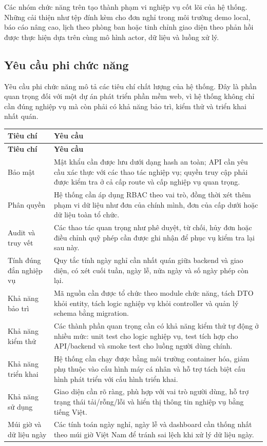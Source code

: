 Các nhóm chức năng trên tạo thành phạm vi nghiệp vụ cốt lõi của hệ thống. Những cải thiện như tệp đính kèm cho đơn nghỉ trong môi trường demo local, báo cáo nâng cao, lịch theo phòng ban hoặc tinh chỉnh giao diện theo phản hồi được thực hiện dựa trên cùng mô hình actor, dữ liệu và luồng xử lý.

\subsection{Yêu cầu phi chức năng}
Yêu cầu phi chức năng mô tả các tiêu chí chất lượng của hệ thống. Đây là phần quan trọng đối với một dự án phát triển phần mềm web, vì hệ thống không chỉ cần đúng nghiệp vụ mà còn phải có khả năng bảo trì, kiểm thử và triển khai nhất quán.

\begin{longtable}{p{}p{}}
\toprule
\textbf{Tiêu chí} & \textbf{Yêu cầu} \\
\midrule
\endfirsthead
\toprule
\textbf{Tiêu chí} & \textbf{Yêu cầu} \\
\midrule
\endhead
Bảo mật & Mật khẩu cần được lưu dưới dạng hash an toàn; API cần yêu cầu xác thực với các thao tác nghiệp vụ; quyền truy cập phải được kiểm tra ở cả cấp route và cấp nghiệp vụ quan trọng. \\
Phân quyền & Hệ thống cần áp dụng RBAC theo vai trò, đồng thời xét thêm phạm vi dữ liệu như đơn của chính mình, đơn của cấp dưới hoặc dữ liệu toàn tổ chức. \\
Audit và truy vết & Các thao tác quan trọng như phê duyệt, từ chối, hủy đơn hoặc điều chỉnh quỹ phép cần được ghi nhận để phục vụ kiểm tra lại sau này. \\
Tính đúng đắn nghiệp vụ & Quy tắc tính ngày nghỉ cần nhất quán giữa backend và giao diện, có xét cuối tuần, ngày lễ, nửa ngày và số ngày phép còn lại. \\
Khả năng bảo trì & Mã nguồn cần được tổ chức theo module chức năng, tách DTO khỏi entity, tách logic nghiệp vụ khỏi controller và quản lý schema bằng migration. \\
Khả năng kiểm thử & Các thành phần quan trọng cần có khả năng kiểm thử tự động ở nhiều mức: unit test cho logic nghiệp vụ, test tích hợp cho API/backend và smoke test cho luồng người dùng chính. \\
Khả năng triển khai & Hệ thống cần chạy được bằng môi trường container hóa, giảm phụ thuộc vào cấu hình máy cá nhân và hỗ trợ tách biệt cấu hình phát triển với cấu hình triển khai. \\
Khả năng sử dụng & Giao diện cần rõ ràng, phù hợp với vai trò người dùng, hỗ trợ trạng thái tải/rỗng/lỗi và hiển thị thông tin nghiệp vụ bằng tiếng Việt. \\
Múi giờ và dữ liệu ngày & Các tính toán ngày nghỉ, ngày lễ và dashboard cần thống nhất theo múi giờ Việt Nam để tránh sai lệch khi xử lý dữ liệu ngày. \\
\bottomrule
\end{longtable}

